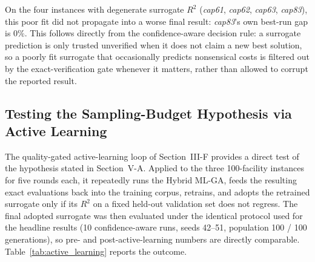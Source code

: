 \documentclass[conference]{IEEEtran}
\begin{document}
On the four instances with degenerate surrogate $R^2$ (\emph{cap61},
\emph{cap62}, \emph{cap63}, \emph{cap83}), this poor fit did not propagate
into a worse final result: \emph{cap83}'s own best-run gap is $0\%$. This
follows directly from the confidence-aware decision rule: a surrogate
prediction is only trusted unverified when it does not claim a new best
solution, so a poorly fit surrogate that occasionally predicts nonsensical
costs is filtered out by the exact-verification gate whenever it matters,
rather than allowed to corrupt the reported result.

\subsection{Testing the Sampling-Budget Hypothesis via Active Learning}

The quality-gated active-learning loop of Section~III-F provides a direct test
of the hypothesis stated in Section~V-A. Applied to the three 100-facility
instances for five rounds each, it repeatedly runs the Hybrid ML-GA, feeds the
resulting exact evaluations back into the training corpus, retrains, and
adopts the retrained surrogate only if its $R^2$ on a fixed held-out
validation set does not regress. The final adopted surrogate was then
evaluated under the identical protocol used for the headline results (10
confidence-aware runs, seeds 42--51, population 100 / 100 generations), so
pre- and post-active-learning numbers are directly comparable.
Table~\ref{tab:active_learning} reports the outcome.

\begin{table}[t]
\centering
\caption{Active learning on the three 100-facility instances: five rounds each. The corpus grows roughly tenfold and surrogate $R^2$ improves on all three instances, yet the resulting optimality gap improves on only one.}
\label{tab:active_learning}
\end{table}
\end{document}
